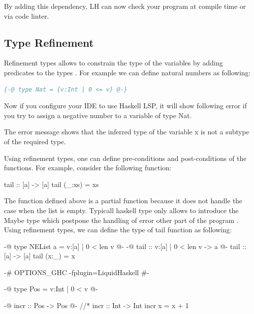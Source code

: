 \documentclass[]{rptuseminar}
\begin{document}
By adding this dependency, LH can now check your program at compile time or via code linter. 
\subsection{Type Refinement}
Refinement types allows to constrain the type of the variables by adding predicates to the types \cite{jhala_programming_2020}. For example we can define natural numbers as following:
\vspace{1em}
\begin{lstlisting}[language=Haskell]
 {-@ type Nat = {v:Int | 0 <= v} @-}
\end{lstlisting}
\vspace{1em}

Now if you configure your IDE to use Haskell LSP, it will show following error if you try to assign a negative number to a variable of type Nat.
The error message shows that the inferred type of the variable x is not a subtype of the required type.

Using refinement types, one can define pre-conditions and post-conditions of the functions\cite{jhala_programming_2020}. 
For example, consider the following function:
\begin{haskell}
  tail :: [a] -> [a]
  tail (_:xs) = xs
\end{haskell}
The function defined above is a partial function because it does not handle the case when the list is empty. 
Typicall haskell type only allows to introduce the Maybe type which postpone the handling of error other 
part of the program \cite{jhala_programming_2020}. Using refinement types, we can define the type of tail function as following:
\begin{haskell}
  {-@ type NEList a = {v:[a] | 0 < len v} @-}
  {-@ tail :: {v:[a] | 0 < len v} -> a @-}
  tail :: [a] -> [a]
  tail (x:_) = x
\end{haskell}

\begin{haskell}
 {-# OPTIONS_GHC -fplugin=LiquidHaskell #-}

 {-@ type Pos = {v:Int | 0 < v} @-}

 {-@ incr :: Pos -> Pos @-} //*\label{srcline:typerefinement}
 incr :: Int -> Int
 incr x = x + 1 
\end{haskell}
\end{document}
